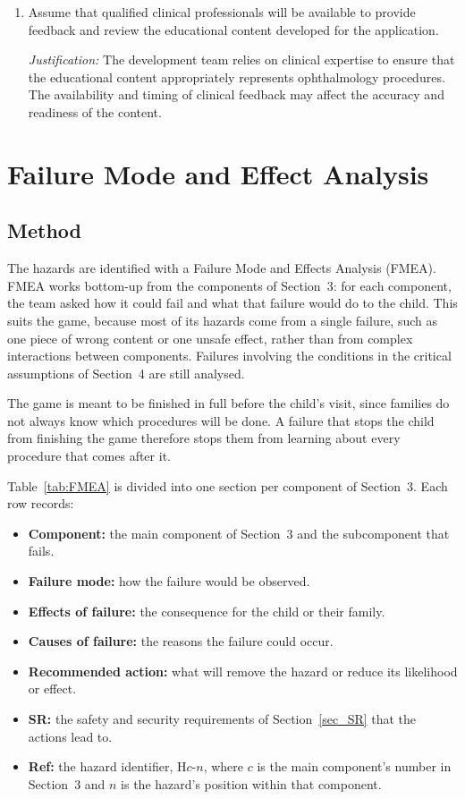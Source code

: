 \documentclass{article}
\newcounter{hazard}
\begin{document}
\begin{enumerate}
    \item Assume that qualified clinical professionals will be
    available to provide feedback and review the educational
    content developed for the application.

    \textit{Justification:}
    The development team relies on clinical expertise to ensure
    that the educational content appropriately represents
    ophthalmology procedures. The availability and timing of
    clinical feedback may affect the accuracy and readiness
    of the content.

\end{enumerate}

\section{Failure Mode and Effect Analysis}
\label{sec_FMEA}

\subsection{Method}

The hazards are identified with a Failure Mode and Effects Analysis (FMEA).
FMEA works bottom-up from the components of Section~3: for each component, the
team asked how it could fail and what that failure would do to the child. This
suits the game, because most of its hazards come from a single failure, such
as one piece of wrong content or one unsafe effect, rather than from complex
interactions between components. Failures involving the conditions in the
critical assumptions of Section~4 are still analysed.

The game is meant to be finished in full before the child's visit, since
families do not always know which procedures will be done. A failure that
stops the child from finishing the game therefore stops them from learning
about every procedure that comes after it.

Table~\ref{tab:FMEA} is divided into one section per component of
Section~3. Each row records:

\begin{itemize}
  \item \textbf{Component:} the main component of Section~3 and the
  subcomponent that fails.
  \item \textbf{Failure mode:} how the failure would be observed.
  \item \textbf{Effects of failure:} the consequence for the child or their
  family.
  \item \textbf{Causes of failure:} the reasons the failure could occur.
  \item \textbf{Recommended action:} what will remove the hazard or reduce its
  likelihood or effect.
  \item \textbf{SR:} the safety and security requirements of
  Section~\ref{sec_SR} that the actions lead to.
  \item \textbf{Ref:} the hazard identifier, H$c$-$n$, where $c$ is the main
  component's number in Section~3 and $n$ is the hazard's position within that
  component.
\end{itemize}
\end{document}
